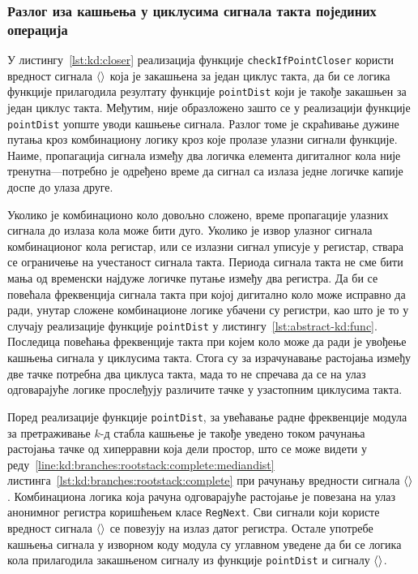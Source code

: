 \documentclass[master]{finthesis}
\newcommand*{\kd}{\texorpdfstring{$k$}{k}-д }
\newcommand*{\correctmath}[1]{%
    \ifcsname mathCorrectionFor#1\endcsname%
        \csname mathCorrectionFor#1\endcsname%
    \else%
        #1%
    \fi%
}
\newcommand*{\mfield}[1]{{\langle\correctmath{#1}\/\rangle}}
\newcommand*{\field}[1]{\texorpdfstring{$\mfield{#1}$}{⟨#1⟩}}
\newcommand*{\prog}[1]{\texttt{#1}}
\newcommand*{\func}[1]{\prog{#1}}
\begin{document}
\subsubsection{Разлог иза кашњења у циклусима сигнала такта појединих операција}

У листингу~\ref{lst:kd:closer} реализација функције \func{checkIfPointCloser} користи вредност сигнала \field{outPRom} која је закашњена за један циклус такта, да би се логика функције прилагодила резултату функције \func{pointDist} који је такође закашњен за један циклус такта. Међутим, није образложено зашто се у реализацији функције \func{pointDist} уопште уводи кашњење сигнала. Разлог томе је скраћивање дужине путања кроз комбинациону логику кроз које пролазе улазни сигнали функције. Наиме, пропагација сигнала између два логичка елемента дигиталног кола није тренутна---потребно је одређено време да сигнал са излаза једне логичке капије доспе до улаза друге.

Уколико је комбинационо коло довољно сложено, време пропагације улазних сигнала до излаза кола може бити дуго. Уколико је извор улазног сигнала комбинационог кола регистар, или се излазни сигнал уписује у регистар, ствара се ограничење на учестаност сигнала такта. Периода сигнала такта не сме бити мања од временски најдуже логичке путање између два регистра. Да би се повећала фреквенција сигнала такта при којој дигитално коло може исправно да ради, унутар сложене комбинационе логике убачени су регистри, као што је то у случају реализације функције \func{pointDist} у листингу~\ref{lst:abstract-kd:func}. Последица повећања фреквенције такта при којем коло може да ради је увођење кашњења сигнала у циклусима такта. Стога су за израчунавање растојања између две тачке потребна два циклуса такта, мада то не спречава да се на улаз одговарајуће логике прослеђују различите тачке у узастопним циклусима такта.

Поред реализације функције \func{pointDist}, за увећавање радне фреквенције модула за претраживање \kd стабла кашњење је такође уведено током рачунања растојања тачке од хиперравни која дели простор, што се може видети у реду~\ref{line:kd:branches:rootstack:complete:mediandist} листинга~\ref{lst:kd:branches:rootstack:complete} при рачунању вредности сигнала \field{medianDist}. Комбинациона логика која рачуна одговарајуће растојање је повезана на улаз анонимног регистра коришћењем класе \prog{RegNext}. Сви сигнали који користе вредност сигнала \field{medianDist} се повезују на излаз датог регистра. Остале употребе кашњења сигнала у изворном коду модула су углавном уведене да би се логика кола прилагодила закашњеном сигналу из функције \func{pointDist} и сигналу \field{medianDist}.
\end{document}
